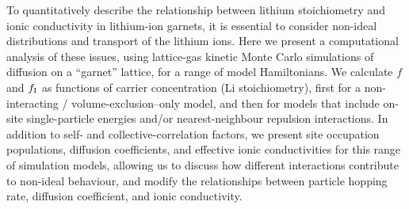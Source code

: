 \documentclass[aps,prb,twocolumn,superscriptaddress,reprint]{revtex4-1}
\newcommand{\xLi}{x_\m{Li}}
\begin{document}
To quantitatively describe the relationship between lithium stoichiometry and ionic conductivity in lithium-ion garnets, it is essential to consider non-ideal distributions and transport of the lithium ions. 
Here we present a computational analysis of these issues, using lattice-gas kinetic Monte Carlo simulations of diffusion on a ``garnet'' lattice, for a range of model Hamiltonians. 
We calculate $f$ and $f_{\mathrm{I}}$ as functions of carrier concentration (Li stoichiometry), first for a non-interacting / volume-exclusion--only model, and then for models that include on-site single-particle energies and/or nearest-neighbour repulsion interactions. 
In addition to self- and collective-correlation factors, we present site occupation populations, diffusion coefficients, and effective ionic conductivities for this range of simulation models, allowing us to discuss how different interactions contribute to non-ideal behaviour, and modify the relationships between particle hopping rate, diffusion coefficient, and ionic conductivity. 

 

\end{document}
